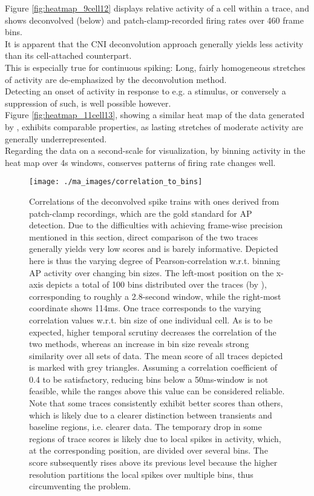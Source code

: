 \documentclass[titlepage]{article}
\begin{document}
Figure \ref{fig:heatmap_9cell12} displays relative activity of a cell within a trace, and shows deconvolved (below) and patch-clamp-recorded firing rates over 460 frame bins.\\
It is apparent that the CNI deconvolution approach generally yields less activity than its cell-attached counterpart. \\
This is especially true for continuous spiking: Long, fairly homogeneous stretches of activity are de-emphasized by the deconvolution method.\\
Detecting an onset of activity in response to e.g. a stimulus, or conversely a suppression of such, is well possible however.\\
Figure \ref{fig:heatmap_11cell13}, showing a similar heat map of the data generated by \citeauthor{chen_ultrasensitive_2013}, exhibits comparable properties, as lasting stretches of moderate activity are generally underrepresented.\\
Regarding the data on a second-scale for visualization, by binning activity in the heat map over 4s windows, conserves patterns of firing rate changes well.
\begin{figure}\label{fig:correlation_to_bins}
\centering
\texttt{[image: ./ma\_images/correlation\_to\_bins]}
\caption[Caption for LOF] {Correlations of the deconvolved spike trains with ones derived from patch-clamp recordings, which are the gold standard for AP detection. Due to the difficulties with achieving frame-wise precision mentioned in this section, direct comparison of the two traces generally yields very low scores and is barely informative\cite{theis_benchmarking_2016}. Depicted here is thus the varying degree of Pearson-correlation w.r.t. binning AP activity over changing bin sizes. The left-most  position on the x-axis depicts a total of 100 bins distributed over the traces (by \citeauthor{akerboom_optimization_2012}\cite{akerboom_optimization_2012}), corresponding to roughly a 2.8-second window, while the right-most coordinate shows 114ms. One trace corresponds to the varying correlation values w.r.t. bin size of one individual cell. As is to be expected, higher temporal scrutiny decreases the correlation of the two methods, whereas an increase in bin size reveals strong similarity over all sets of data. The mean score of all traces depicted is marked with grey triangles. Assuming a correlation coefficient of 0.4 to be satisfactory\cite{theis_benchmarking_2016}, reducing bins below a 50ms-window is not feasible, while the ranges above this value can be considered reliable. Note that some traces consistently exhibit better scores than others, which is likely due to a clearer distinction between transients and baseline regions, i.e. clearer data.
The temporary drop in some regions of trace scores is likely due to local spikes in activity, which, at the corresponding position, are divided over several bins. The score subsequently rises above its previous level because the higher resolution partitions the local spikes over  multiple bins, thus circumventing the problem.}
\end{figure}
\end{document}
